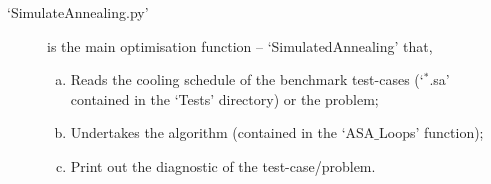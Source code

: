\documentclass[14pt,twoside]{article}
\begin{document}
\begin{description}
      \item[`SimulateAnnealing.py'] is the main optimisation function -- `SimulatedAnnealing' that,
           \begin{enumerate}[a)]
               \item Reads the cooling schedule of the benchmark test-cases (`$^{\ast}$.sa' contained in the `Tests' directory) or the problem;
               \item Undertakes the algorithm (contained in the `ASA$\_$Loops' function);
               \item Print out the diagnostic of the test-case/problem.
           \end{enumerate}



   \end{description}
\end{document}
